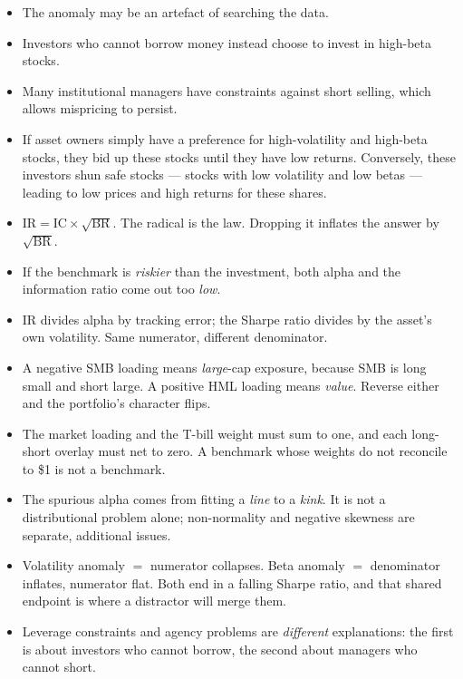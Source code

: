 \begin{itemize}
\item {} The anomaly may be an artefact of searching the data.
\item {} Investors who cannot borrow money instead
choose to invest in high-beta stocks.
\item {} Many institutional managers have constraints
against short selling, which allows mispricing to persist.
\item {} If asset owners simply have a preference for
high-volatility and high-beta stocks, they bid up these stocks until they have
low returns. Conversely, these investors shun safe stocks --- stocks with low
volatility and low betas --- leading to low prices and high returns for these
shares.
\end{itemize}

\begin{imtrapbox}[title={Consolidated trap summary --- IM-3}]
\begin{itemize}
\item {} $\text{IR} = \text{IC}\times\sqrt{\text{BR}}$. The
radical is the law. Dropping it inflates the answer by $\sqrt{\text{BR}}$.
\item {} If the benchmark is \emph{riskier} than the
investment, both alpha and the information ratio come out too \emph{low}.
\item {} IR divides alpha by tracking error; the Sharpe
ratio divides by the asset's own volatility. Same numerator, different
denominator.
\item {} A negative SMB loading means \emph{large}-cap
exposure, because SMB is long small and short large. A positive HML loading
means \emph{value}. Reverse either and the portfolio's character flips.
\item {} The market loading and the T-bill
weight must sum to one, and each long-short overlay must net to zero. A benchmark
whose weights do not reconcile to \$1 is not a benchmark.
\item {} The spurious alpha comes from fitting a
\emph{line} to a \emph{kink}. It is not a distributional problem alone;
non-normality and negative skewness are separate, additional issues.
\item {} Volatility anomaly $=$ numerator collapses. Beta
anomaly $=$ denominator inflates, numerator flat. Both end in a falling Sharpe
ratio, and that shared endpoint is where a distractor will merge them.
\item {} Leverage constraints and agency problems are
\emph{different} explanations: the first is about investors who cannot borrow,
the second about managers who cannot short.
\end{itemize}
\end{imtrapbox}

